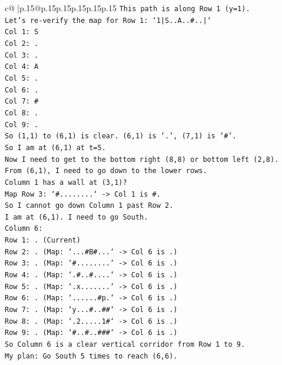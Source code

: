 \documentclass{article}
\begin{document}
{\begin{supertabular}{c@{$\;$}|p{.15\linewidth}@{}p{.15\linewidth}p{.15\linewidth}p{.15\linewidth}p{.15\linewidth}p{.15\linewidth}}
{{{\texttt{This path is along Row 1 (y=1).} \\
\texttt{Let's re{-}verify the map for Row 1: `1|S..A..\#..|`} \\
\texttt{Col 1: S} \\
\texttt{Col 2: .} \\
\texttt{Col 3: .} \\
\texttt{Col 4: A} \\
\texttt{Col 5: .} \\
\texttt{Col 6: .} \\
\texttt{Col 7: \#} \\
\texttt{Col 8: .} \\
\texttt{Col 9: .} \\
\texttt{So (1,1) to (6,1) is clear. (6,1) is '.', (7,1) is '\#'.} \\
\texttt{So I am at (6,1) at t=5.} \\
\texttt{Now I need to get to the bottom right (8,8) or bottom left (2,8).} \\
\texttt{From (6,1), I need to go down to the lower rows.} \\
\texttt{Column 1 has a wall at (3,1)?} \\
\texttt{Map Row 3: `\#........` {-}> Col 1 is \#.} \\
\texttt{So I cannot go down Column 1 past Row 2.} \\
\texttt{I am at (6,1). I need to go South.} \\
\texttt{Column 6:} \\
\texttt{Row 1: . (Current)} \\
\texttt{Row 2: . (Map: `...\#B\#...` {-}> Col 6 is .)} \\
\texttt{Row 3: . (Map: `\#........` {-}> Col 6 is .)} \\
\texttt{Row 4: . (Map: `.\#..\#....` {-}> Col 6 is .)} \\
\texttt{Row 5: . (Map: `.x.......` {-}> Col 6 is .)} \\
\texttt{Row 6: . (Map: `......\#p.` {-}> Col 6 is .)} \\
\texttt{Row 7: . (Map: `y...\#..\#\#` {-}> Col 6 is .)} \\
\texttt{Row 8: . (Map: `.2.....1\#` {-}> Col 6 is .)} \\
\texttt{Row 9: . (Map: `\#..\#..\#\#\#` {-}> Col 6 is .)} \\
\texttt{So Column 6 is a clear vertical corridor from Row 1 to 9.} \\
\texttt{My plan: Go South 5 times to reach (6,6).} \\
}}}
\end{supertabular}}
\end{document}
